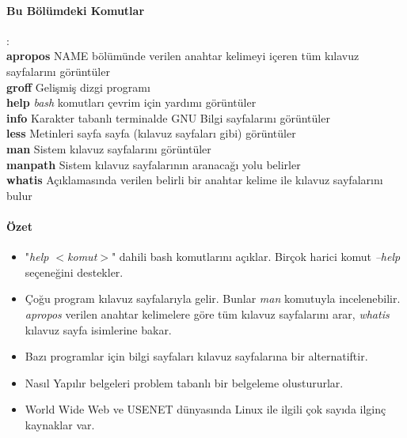 \paragraph{Bu Bölümdeki Komutlar}{:\\
\textbf{apropos}	NAME bölümünde verilen anahtar kelimeyi içeren tüm kılavuz sayfalarını görüntüler \\
\textbf{groff}		Gelişmiş dizgi programı \\
\textbf{help}		\emph{bash} komutları çevrim için yardımı görüntüler \\
\textbf{info}		Karakter tabanlı terminalde GNU Bilgi sayfalarını görüntüler \\
\textbf{less}		Metinleri sayfa sayfa (kılavuz sayfaları gibi) görüntüler \\
\textbf{man}		Sistem kılavuz sayfalarını görüntüler \\
\textbf{manpath}		Sistem kılavuz sayfalarının aranacağı yolu belirler \\
\textbf{whatis}		Açıklamasında verilen belirli bir anahtar kelime ile kılavuz sayfalarını bulur \\
}
\paragraph{Özet}{
\begin{itemize}
\item "\emph{help $<$komut$>$}" dahili bash komutlarını açıklar. Birçok harici komut \emph{--help} seçeneğini destekler.
\item Çoğu program kılavuz sayfalarıyla gelir. Bunlar \emph{man} komutuyla incelenebilir. \emph{apropos} verilen anahtar kelimelere göre tüm kılavuz sayfalarını arar, \emph{whatis} kılavuz sayfa isimlerine bakar.
\item Bazı programlar için bilgi sayfaları kılavuz sayfalarına bir alternatiftir.
\item Nasıl Yapılır belgeleri problem tabanlı bir belgeleme olustururlar.
\item World Wide Web ve USENET dünyasında Linux ile ilgili çok sayıda ilginç kaynaklar var.
\end{itemize}}